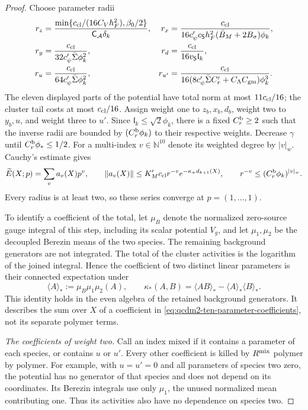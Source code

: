 \documentclass[11pt,letterpaper,reqno]{amsart}
\theoremstyle{definition}
\theoremstyle{remark}
\begin{document}
\begin{proof}
Choose parameter radii
\begin{align*}
 r_z&=\frac{\min\{c_{\rm cl}/(16C_Vh_F^2),\beta_0/2\}}
                  {\mathsf C_{\mathcal A}\delta_k},&
 r_x&=\frac{c_{\rm cl}}
 {16c'_\psi c_{\mathsf S}h_F^2(\bar B_M+2B_\sigma)\phi_k},\\
 r_y&=\frac{c_{\rm cl}}{32c'_\psi\bar\Sigma\phi_k^2},&
 r_d&=\frac{c_{\rm cl}}{16v_{\mathsf S}\mathfrak l_k},\\
 r_u&=\frac{c_{\rm cl}}{64c'_\psi\bar\Sigma\phi_k^2},&
 r_{u'}&=\frac{c_{\rm cl}}
 {16(8c'_\psi\bar\Sigma C'_r+C_\Lambda C_{\rm gm})\phi_k^3}.
\end{align*}
The eleven displayed parts of the potential have total norm
at most $11c_{\rm cl}/16$; the cluster tail costs at most
$c_{\rm cl}/16$.  Assign weight one to $z_b,x_b,d_b$, weight
two to $y_b,u$, and weight three to $u'$.
Since $\mathfrak l_k\le\sqrt2\phi_k$, there is a fixed
$C_r^{\rm b}\ge2$ such that the inverse radii are bounded by
$(C_r^{\rm b}\phi_k)$ to their respective weights.  Decrease
$\gamma$ until $C_r^{\rm b}\phi_*\le1/2$.
For a multi-index $v\in\mathbb N^{10}$ denote its weighted
degree by $|v|_w$.  Cauchy's estimate gives
\begin{equation}\label{eq:qcdm2-ten-parameter-coefficients}
 \widetilde E(X;p)=\sum_v a_v(X)p^v,\qquad
 \|a_v(X)\|\le K'_Mc_{\rm cl}r^{-v}
                        e^{-\kappa_+d_{k+1}(X)},\qquad
 r^{-v}\le(C_r^{\rm b}\phi_k)^{|v|_w}.
\end{equation}
Every radius is at least two, so these series converge
at $p=(1,\ldots,1)$.

To identify a coefficient of the total, let $\mu_B$
denote the normalized zero-source gauge integral of this
step, including its scalar potential $V_g$, and let
$\mu_1,\mu_2$ be the decoupled Berezin means of the two
species.  The remaining background generators are not
integrated.  The total of the cluster activities is
the logarithm of the joined integral.  Hence the
coefficient of two distinct linear parameters is
their connected expectation under
\[
 \langle A\rangle_*:=\mu_B\mu_1\mu_2(A),\qquad
 \kappa_*(A,B)=\langle AB\rangle_*
                         -\langle A\rangle_*\langle B\rangle_*.
\]
This identity holds in the even algebra of the retained
background generators.  It describes the sum over $X$
of a coefficient in \eqref{eq:qcdm2-ten-parameter-coefficients},
not its separate polymer terms.

\emph{The coefficients of weight two.}
Call an index mixed if it contains a parameter of each
species, or contains $u$ or $u'$.  Every other coefficient
is killed by $R^{\rm mix}$ polymer by polymer.  For example,
with $u=u'=0$ and all parameters of species two zero,
the potential has no generator of that species and
does not depend on its coordinates.  Its Berezin
integrals use only $\mu_1$, the unused normalized
mean contributing one.  Thus its activities also
have no dependence on species two.


\end{proof}
\end{document}
